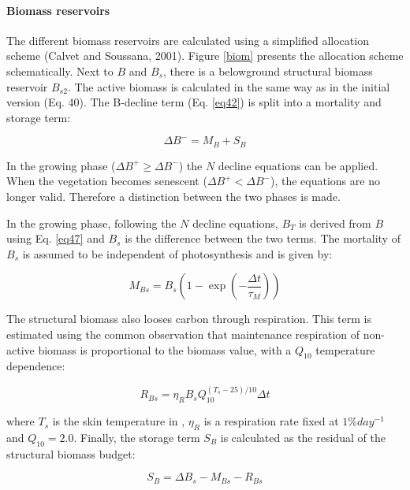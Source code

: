 {\paragraph{Biomass reservoirs}

The different biomass reservoirs are calculated using a simplified
allocation scheme (Calvet and Soussana, 2001). 
Figure \ref{biom} presents the allocation scheme schematically. Next to $B$ and $B_{s}$, there is
a belowground structural biomass reservoir $B_{s2}$. The active biomass is calculated in the same way as
in the initial version (Eq. 40). The B-decline term (Eq. \ref{eq42}) is split into a mortality and storage term:

\begin{equation}\label{eq52}
\Delta B^{-} = M_{B}+S_{B}
\end{equation}

In the growing phase ($\Delta B^{+} \ge \Delta B^{-}$) 
the $N$ decline equations can be applied. When the vegetation
becomes senescent ($\Delta B^{+} < \Delta B^{-}$), the equations are no longer valid. Therefore a distinction between the
two phases is made.

In the growing phase, following the $N$ decline equations, $B_{T}$ is derived from $B$ using Eq. \ref{eq47} and $B_{s}$ is
the difference between the two terms. The mortality of $B_{s}$ is assumed to be independent of
photosynthesis and is given by:

\begin{equation}\label{eq53}
M_{Bs} = B_{s} \left (   1-\exp \left (  -\frac{\Delta t}{\tau_{M}}      \right )           \right )
\end{equation}

The structural biomass also looses carbon through respiration. This term is estimated using the
common observation that maintenance respiration of non-active biomass is proportional to the
biomass value, with a $Q_{10}$ temperature dependence:

\begin{equation}\label{eq54}
R_{Bs} = \eta_{R}B_{s}Q_{10}^{(T_{s}-25)/10} \Delta t
\end{equation}

where $T_{s}$ is the skin temperature in \textcelsius, $\eta_{R}$ is a respiration rate fixed at $1\% day^{-1}$
and $Q_{10}=2.0$. Finally,
the storage term $S_{B}$ is calculated as the residual of the structural biomass budget:

\begin{equation}\label{eq55}
S_{B} = \Delta B_{s} - M_{Bs} -  R_{Bs}
\end{equation}

}
